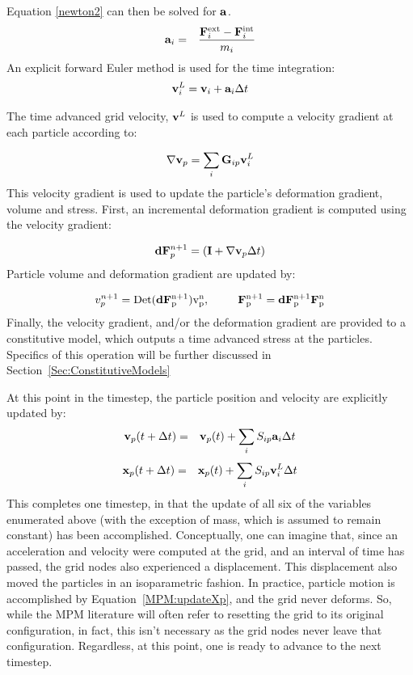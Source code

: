 Equation \ref{newton2} can then be solved for ${\bf a}$.
\begin{eqnarray}
{\bf a}_i &=& \frac{{\bf F}_i^{\rm{ext}} - {\bf F}_i^{\rm{int}}}{m_i}
\label{MPM:acceleration}
\end{eqnarray}
An explicit forward Euler method is used for the time integration:
\begin{eqnarray}
{\bf v}_i^L= {\bf v}_i + {\bf a}_i \Delta{t}
\label{MPM:euler}
\end{eqnarray}

The time advanced grid velocity, ${\bf v}^L$ is used to compute a velocity
gradient at each particle according to:

\begin{equation}
\nabla {\bf v}_p = \sum_i {\bf G}_{ip} {\bf v}^L_i
\label{velgrad}
\end{equation}
This velocity gradient is used to update the particle's deformation gradient,
volume and stress.  First, an incremental deformation gradient is computed
using the velocity gradient:

\begin{equation}
{\bf d} {\bf F}_p^{n+1} = ({\bf I}+\nabla {\bf v}_p \Delta{t})
\label{Finc}
\end{equation}
Particle volume and deformation gradient are updated by:

\begin{eqnarray}
v_p^{n+1} = \rm{Det}({\bf d}{\bf F}_p^{n+1})v_p^n,  \;\;\;\;\;\;\;\;\;
{\bf F}_p^{n+1}={\bf d}{\bf F}_p^{n+1} {\bf F}_{p}^{n}
\label{p_vol}
\end{eqnarray}
Finally, the velocity gradient, and/or the deformation gradient are
provided to a constitutive model, which outputs a time advanced stress
at the particles.  Specifics of this operation will be further discussed
in Section~\ref{Sec:ConstitutiveModels}

At this point in the timestep, the particle position and velocity are explicitly
updated by:
\begin{eqnarray}
{\bf v}_p (t + \Delta{t})  &=& {\bf v}_p (t)  + \sum_{i} S_{ip} {\bf a}_i  \Delta{t} 
\label{MPM:updateVp}
\end{eqnarray}
\begin{eqnarray}
{\bf x}_p (t + \Delta{t})  &=& {\bf x}_p (t)  + \sum_{i} S_{ip} {\bf v}^L_i  \Delta{t}
\label{MPM:updateXp}
\end{eqnarray}
This completes one timestep, in that the update of all six of the variables
enumerated above (with the exception of mass, which is assumed to remain
constant) has been accomplished.  Conceptually, one can imagine that, since an
acceleration and velocity were computed at the grid, and an interval of time
has passed, the grid nodes also experienced a displacement.  This 
displacement also moved the particles in an isoparametric fashion.  In
practice, particle motion is accomplished by Equation~\ref{MPM:updateXp},
and the grid never deforms.  So, while the MPM literature will often refer
to resetting the grid to its original configuration, in fact, this 
isn't necessary as the grid nodes never leave that configuration.  Regardless,
at this point, one is ready to advance to the next timestep.

